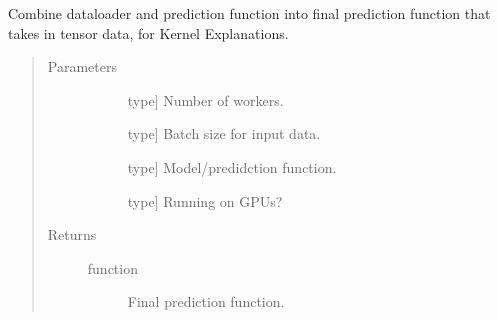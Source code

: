 \documentclass[letterpaper,10pt,english]{sphinxmanual}
\begin{document}

\begin{fulllineitems}
\label{\detokenize{index:methylnet.interpretation_classes.main_prediction_function}}
Combine dataloader and prediction function into final prediction function that takes in tensor data, for Kernel Explanations.
\begin{quote}\begin{description}
\item[{Parameters}] \leavevmode\begin{description}
\item[{}] \leavevmode{[}type{]}
Number of workers.

\item[{}] \leavevmode{[}type{]}
Batch size for input data.

\item[{}] \leavevmode{[}type{]}
Model/predidction function.

\item[{}] \leavevmode{[}type{]}
Running on GPUs?

\end{description}

\item[{Returns}] \leavevmode\begin{description}
\item[{function}] \leavevmode
Final prediction function.

\end{description}

\end{description}\end{quote}

\end{fulllineitems}

\end{document}
